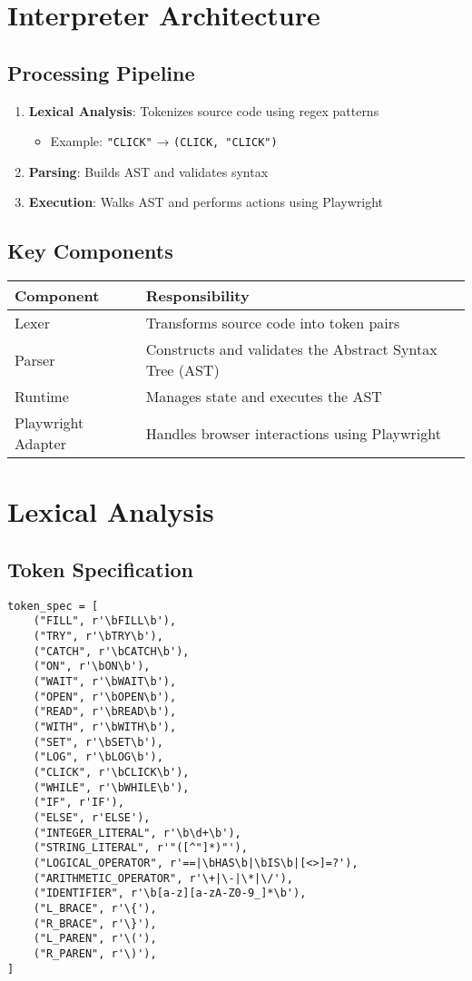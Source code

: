 \documentclass[11pt]{article}
\begin{document}
\section{Interpreter Architecture}
\label{sec:orgc2ee916}

\subsection{Processing Pipeline}
\label{sec:org08efd3c}
\begin{enumerate}
\item \textbf{Lexical Analysis}: Tokenizes source code using regex patterns
\begin{itemize}
\item Example: \texttt{"CLICK"} → \texttt{(CLICK, "CLICK")}
\end{itemize}
\item \textbf{Parsing}: Builds AST and validates syntax
\item \textbf{Execution}: Walks AST and performs actions using Playwright
\end{enumerate}
\subsection{Key Components}
\label{sec:orge4404d5}

\begin{center}
\begin{tabular}{ll}
Component & Responsibility\\
\hline
Lexer & Transforms source code into token pairs\\
Parser & Constructs and validates the Abstract Syntax Tree (AST)\\
Runtime & Manages state and executes the AST\\
Playwright Adapter & Handles browser interactions using Playwright\\
\end{tabular}
\end{center}
\section{Lexical Analysis}
\label{sec:org56fecd5}

\subsection{Token Specification}
\label{sec:orga1346f2}
\begin{verbatim}
token_spec = [
    ("FILL", r'\bFILL\b'),
    ("TRY", r'\bTRY\b'),
    ("CATCH", r'\bCATCH\b'),
    ("ON", r'\bON\b'),
    ("WAIT", r'\bWAIT\b'),
    ("OPEN", r'\bOPEN\b'),
    ("READ", r'\bREAD\b'),
    ("WITH", r'\bWITH\b'),
    ("SET", r'\bSET\b'),
    ("LOG", r'\bLOG\b'),
    ("CLICK", r'\bCLICK\b'),
    ("WHILE", r'\bWHILE\b'),
    ("IF", r'IF'),
    ("ELSE", r'ELSE'),
    ("INTEGER_LITERAL", r'\b\d+\b'),
    ("STRING_LITERAL", r'"([^"]*)"'),
    ("LOGICAL_OPERATOR", r'==|\bHAS\b|\bIS\b|[<>]=?'),
    ("ARITHMETIC_OPERATOR", r'\+|\-|\*|\/'),
    ("IDENTIFIER", r'\b[a-z][a-zA-Z0-9_]*\b'),
    ("L_BRACE", r'\{'),
    ("R_BRACE", r'\}'),
    ("L_PAREN", r'\('),
    ("R_PAREN", r'\)'),
]
\end{verbatim}
\end{document}
